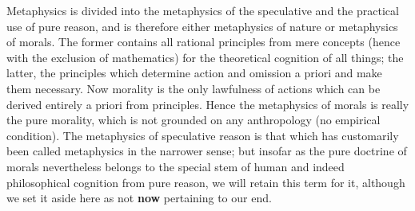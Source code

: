 \documentclass{article}
\begin{document}
Metaphysics is divided into the metaphysics of the speculative
and the practical use of pure reason, and is therefore either
metaphysics of nature or metaphysics of morals.
The former contains all rational principles from mere concepts
(hence with the exclusion of mathematics) 
for the theoretical cognition of all things;
the latter, the principles which determine action and omission a priori
and make them necessary. 
Now morality is the only lawfulness of actions which can be
derived entirely a priori from principles. 
Hence the metaphysics of morals is really the pure morality,
which is not grounded on any anthropology (no empirical condition).
The metaphysics of speculative reason 
is that which has customarily been called metaphysics
in the narrower sense;
but insofar as the pure doctrine of morals nevertheless
belongs to the special stem of human 
and indeed philosophical cognition from pure reason,
we will retain this term for it, 
although we set it aside here as not \textbf{now} pertaining to our end.
\end{document}
